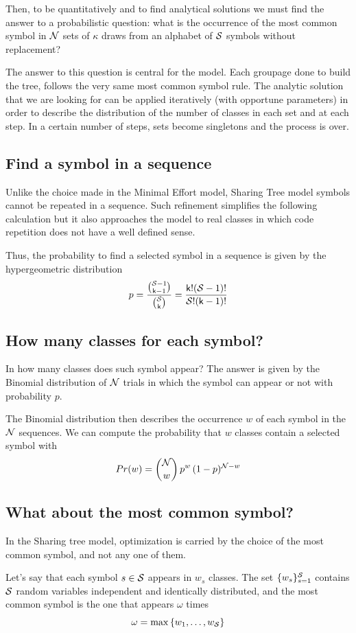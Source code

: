 Then, to be quantitatively and to find analytical solutions we must find the answer to a probabilistic question: what is the occurrence of the most common symbol in $\mathcal N$ sets of $\kappa$ draws from an alphabet of $\mathcal S$ symbols without replacement?

The answer to this question is central for the model. Each groupage done to build the tree, follows the very same most common symbol rule. The analytic solution that we are looking for can be applied iteratively (with opportune parameters) in order to describe the distribution of the number of classes in each set and at each step. In a certain number of steps, sets become singletons and the process is over.

\subsection{Find a symbol in a sequence}
Unlike the choice made in the Minimal Effort model, Sharing Tree model symbols cannot be repeated in a sequence. Such refinement simplifies the following calculation but it also approaches the model to real classes in which code repetition does not have a well defined sense.

Thus, the probability to find a selected symbol in a sequence is given by the hypergeometric distribution
\[ p = \frac{\binom{\mathcal S-1}{\mathsf k-1}}{\binom{\mathcal S}{\mathsf k}}= \frac{\mathsf k!(\mathcal S -1)!}{\mathcal S!(\mathsf k -1)!} \]

\subsection{How many classes for each symbol?}
In how many classes does such symbol appear? The answer is given by the Binomial distribution of $\mathcal N$ trials in which the symbol can appear or not with probability $p$.

The Binomial distribution then describes the occurrence $w$ of each symbol in the $\mathcal N$ sequences. We can compute the probability that $w$ classes contain a selected symbol with
\[ Pr(w) = \binom{\mathcal N}{w} \, p^{w} \, (1-p)^{\mathcal N-w} \]

\subsection{What about the most common symbol?}
In the Sharing tree model, optimization is carried by the choice of the most common symbol, and not any one of them.

Let's say that each symbol $s \in \mathcal S$ appears in $w_s$ classes. The set $\{w_s\}_{s=1}^{\mathcal S}$ contains $\mathcal S$ random variables independent and identically distributed, and the most common symbol is the one that appears $\omega$ times
\[ \omega = \max \left\{ w_1, \dots, w_{\mathcal S} \right\} \]

